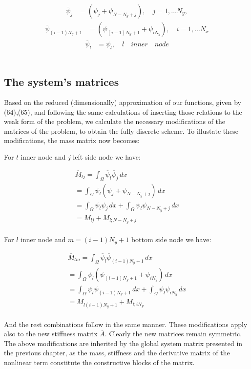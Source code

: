 \documentclass{article}
\begin{document}
\begin{align}
\overline{\psi}_{j}&=(\psi_{j}+\psi_{N-N_y+j}),\quad j=1,\dots N_y,
\end{align}
\begin{align}
\overline{\psi}_{(i-1)N_y+1} &=(\psi_{(i-1)N_y+1}+\psi_{iN_y}),\quad   i=1,\dots N_x
\end{align}
\begin{align}
\overline{\psi}_{l}&=\psi_{l},\quad l\quad inner\quad node
\end{align}\\

\subsection{The system's matrices}
Based on the reduced (dimensionally) approximation of our functions, given by (64),(65), and following the same calculations of inserting those relations to the weak form of the problem, we calculate the necessary modifications of the matrices of the problem, to obtain the fully discrete scheme. To illustate these modifications, the mass matrix now becomes:

For $l$ inner node and $j$ left side node we have:

\begin{align}
\overline{M}_{lj} = \int_{\Omega} \overline{\psi}_l \overline{\psi}_j \, dx\\
= \int_{\Omega} \psi_l (\psi_{j}+\psi_{N-N_y+j}) \, dx \\
= \int_{\Omega} \psi_l \psi_j \, dx +\int_{\Omega} \psi_{l} \psi_{N-N_y+j} \, dx \\
= M_{lj} + M_{l;N-N_y+j} 
\end{align}\\

For $l$ inner node and $m=(i-1)N_y+1$ bottom side node we have:

\begin{align}
\overline{M}_{lm} = \int_{\Omega} \overline{\psi}_l \overline{\psi}_{(i-1)N_y+1} \, dx\\
= \int_{\Omega} \psi_l (\psi_{(i-1)N_y+1}+\psi_{iN_y}) \, dx \\
= \int_{\Omega} \psi_l \psi_{(i-1)N_y+1} \, dx +\int_{\Omega} \psi_{l} \psi_{iN_y} \, dx \\
= M_{l(i-1)N_y+1} + M_{l;iN_y} 
\end{align}\\

And the rest combinations follow in the same manner. These modifications apply also to the new stiffness matrix $\overline{A}$. Clearly the new matrices remain symmetric. The above modifications are inherited by the global system matrix presented in the previous chapter, as the mass, stiffness and the derivative matrix of the nonlinear term constitute the constructive blocks of the matrix.\\
\end{document}
